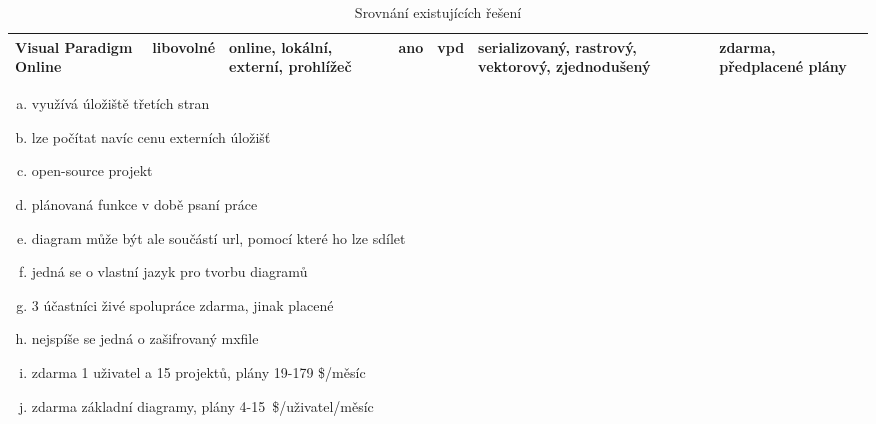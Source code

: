 \begin{table}[!htb]
\begin{center}
{\begin{tabular}{p{0.7in}lp{0.7in}p{0.7in}p{0.8in}p{0.8in}p{0.9in}}
        Visual Paradigm Online & libovolné    & online, lokální, externí, prohlížeč & ano\tnote{\ref{tab:gc:vpo-collab}}            & vpd\tnote{\ref{tab:gc:mxfile-like}}     & serializovaný, rastrový, vektorový, zjednodušený & zdarma, předplacené plány\tnote{\ref{tab:gc:price-vpo}}                    \\ \bottomrule
      \end{tabular}
    }
  \end{center}

  \footnotesize
  \begin{enumerate}[a.,ref = \alph*,noitemsep]
    \item využívá úložiště třetích stran \label{tab:gc:external-storage}
    \item lze počítat navíc cenu externích úložišť \label{tab:gc:price-external-storage}
    \item open-source projekt\label{tab:gc:open-source}
    \item plánovaná funkce v době psaní práce\label{tab:gc:plan}
    \item diagram může být ale součástí \acrshort{url}, pomocí které ho lze sdílet\label{tab:gc:in-url}
    \item jedná se o vlastní jazyk pro tvorbu diagramů\label{tab:gc:custom-lang}
    \item 3 účastníci živé spolupráce zdarma, jinak placené\label{tab:gc:vpo-collab}
    \item nejspíše se jedná o zašifrovaný mxfile\label{tab:gc:mxfile-like}
    \item zdarma 1 uživatel a 15 projektů, plány 19-179 \$/měsíc\label{tab:gc:price-drawsql}
    \item zdarma základní diagramy, plány 4-15~\$/uživatel/měsíc\label{tab:gc:price-vpo}
  \end{enumerate}

  \caption{Srovnání existujících řešení}
  \label{tab:general-comparison}
\end{table}
